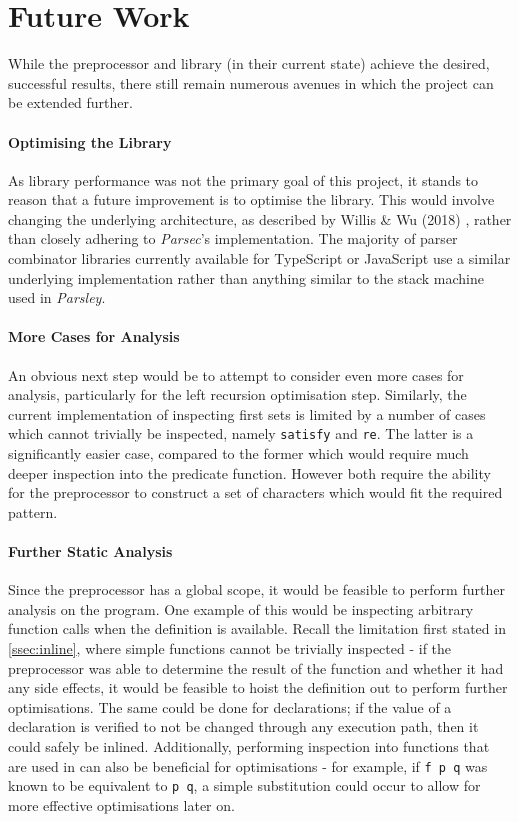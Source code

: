 \section{Future Work}
\label{sec:future}

While the preprocessor and library (in their current state) achieve the desired, successful results, there still remain numerous avenues in which the project can be extended further.

\paragraph*{Optimising the Library}

As library performance was not the primary goal of this project, it stands to reason that a future improvement is to optimise the library.
This would involve changing the underlying architecture, as described by Willis \& Wu (2018) \cite{willis18}, rather than closely adhering to \textit{Parsec}'s implementation.
The majority of parser combinator libraries currently available for TypeScript or JavaScript use a similar underlying implementation rather than anything similar to the stack machine used in \textit{Parsley}.

\paragraph*{More Cases for Analysis}

An obvious next step would be to attempt to consider even more cases for analysis, particularly for the left recursion optimisation step.
Similarly, the current implementation of inspecting first sets is limited by a number of cases which cannot trivially be inspected, namely \texttt{satisfy} and \texttt{re}.
The latter is a significantly easier case, compared to the former which would require much deeper inspection into the predicate function.
However both require the ability for the preprocessor to construct a set of characters which would fit the required pattern.

\paragraph*{Further Static Analysis}

Since the preprocessor has a global scope, it would be feasible to perform further analysis on the program.
One example of this would be inspecting arbitrary function calls when the definition is available.
Recall the limitation first stated in \autoref{ssec:inline}, where simple functions cannot be trivially inspected - if the preprocessor was able to determine the result of the function and whether it had any side effects, it would be feasible to hoist the definition out to perform further optimisations.
The same could be done for declarations; if the value of a declaration is verified to not be changed through any execution path, then it could safely be inlined.
Additionally, performing inspection into functions that are used in \texttt{\fmap} can also be beneficial for optimisations - for example, if \texttt{f \fmap p \ap q} was known to be equivalent to \texttt{p \apl q}, a simple substitution could occur to allow for more effective optimisations later on.

